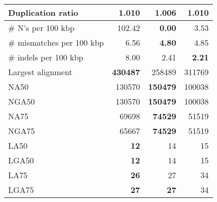 \documentclass[12pt,a4paper]{article}
\begin{document}
\begin{table}[ht]
\begin{center}
\begin{tabular}{|l*{3}{|r}|}
Duplication ratio & 1.010 & {\bf 1.006} & 1.010 \\ \hline
\# N's per 100 kbp & 102.42 & {\bf 0.00} & 3.53 \\ \hline
\# mismatches per 100 kbp & 6.56 & {\bf 4.80} & 4.85 \\ \hline
\# indels per 100 kbp & 8.00 & 2.41 & {\bf 2.21} \\ \hline
Largest alignment & {\bf 430487} & 258489 & 311769 \\ \hline
NA50 & 130570 & {\bf 150479} & 100038 \\ \hline
NGA50 & 130570 & {\bf 150479} & 100038 \\ \hline
NA75 & 69698 & {\bf 74529} & 51519 \\ \hline
NGA75 & 65667 & {\bf 74529} & 51519 \\ \hline
LA50 & {\bf 12} & 14 & 15 \\ \hline
LGA50 & {\bf 12} & 14 & 15 \\ \hline
LA75 & {\bf 26} & 27 & 34 \\ \hline
LGA75 & {\bf 27} & {\bf 27} & 34 \\ \hline
\end{tabular}
\end{center}
\end{table}
\end{document}
